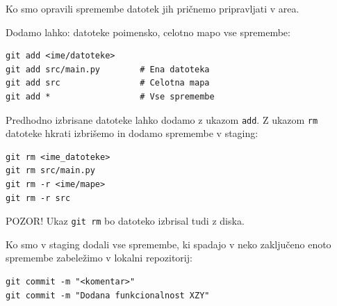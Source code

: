 \documentclass{article}
\begin{document}
\begin{multicols*}{2}
\begin{textbox}[2pink]
Ko smo opravili \colorbox{1yellow}{spremembe datotek} jih pričnemo pripravljati v  area.

Dodamo lahko: datoteke poimensko, celotno mapo vse spremembe:
\end{textbox}

\begin{codebox}[2pink]
\begin{lstlisting}
git add <ime/datoteke>
git add src/main.py        # Ena datoteka
git add src                # Celotna mapa
git add *                  # Vse spremembe
\end{lstlisting}
\end{codebox}

\begin{textbox}[2pink]
Predhodno izbrisane datoteke lahko dodamo z ukazom \lstinline{add}. Z ukazom \lstinline{rm} datoteke hkrati izbrišemo in dodamo spremembe v staging:
\end{textbox}

\begin{codebox}[2pink]
\begin{lstlisting}
git rm <ime_datoteke>
git rm src/main.py
git rm -r <ime/mape>
git rm -r src
\end{lstlisting}
\end{codebox}

\begin{warnbox}[2pink]
POZOR! Ukaz \lstinline{git rm} bo datoteko izbrisal tudi z diska.
\end{warnbox}


\begin{textbox}[3green]
Ko smo v staging dodali vse spremembe, ki spadajo v neko zaključeno enoto spremembe zabeležimo v lokalni repozitorij:
\end{textbox}

\begin{codebox}[3green]
\begin{lstlisting}
git commit -m "<komentar>"
git commit -m "Dodana funkcionalnost XZY"
\end{lstlisting}
\end{codebox}



\end{multicols*}
\end{document}
